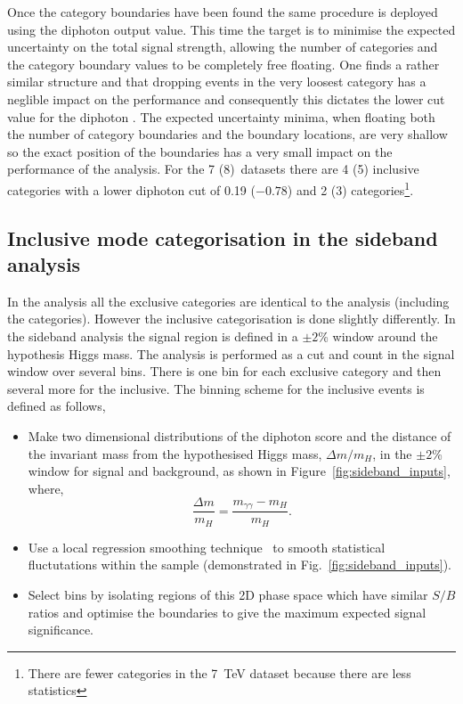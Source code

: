 Once the \VBF category boundaries have been found the same procedure is deployed using the diphoton \BDT output value. This time the target is to minimise the expected uncertainty on the total signal strength, allowing the number of categories and the category boundary values to be completely free floating. One finds a rather similar structure and that dropping events in the very loosest category has a neglible impact on the performance and consequently this dictates the lower cut value for the diphoton \BDT. The expected uncertainty minima, when floating both the number of category boundaries and the boundary locations, are very shallow so the exact position of the boundaries has a very small impact on the performance of the analysis. For the 7 (8)~\TeV datasets there are 4 (5) inclusive categories with a lower diphoton \BDT cut of 0.19 ($-0.78$) and 2 (3) \VBF categories\footnote{There are fewer categories in the 7~TeV dataset because there are less statistics}.

\subsection{Inclusive mode categorisation in the sideband \MVA analysis}
\label{sec:inclusive_cats_sideband}

In the \SMVA analysis all the exclusive categories are identical to the \MFM analysis (including the \VBF categories). However the inclusive categorisation is done slightly differently. In the sideband analysis the signal region is defined in a $\pm2$\% window around the hypothesis Higgs mass. The analysis is performed as a cut and count in the signal window over several bins. There is one bin for each exclusive category and then several more for the inclusive. The binning scheme for the inclusive events is defined as follows,

\begin{itemize}
  \item Make two dimensional distributions of the diphoton \BDT score and the distance of the invariant mass from the hypothesised Higgs mass, $\Delta m/m_{H}$, in the $\pm2$\% window for signal and background, as shown in Figure~\ref{fig:sideband_inputs}, where,
    \begin{equation}
      \frac{\Delta m}{m_{H}} = \frac{m_{\gamma\gamma} - m_{H}}{m_{H}}.
    \end{equation}
  \item Use a local regression smoothing technique~\cite{regression_smoothing} to smooth statistical fluctutations within the sample (demonstrated in Fig.~\ref{fig:sideband_inputs}).
  \item Select bins by isolating regions of this 2D phase space which have similar $S/B$ ratios and optimise the boundaries to give the maximum expected signal significance.   
\end{itemize}

